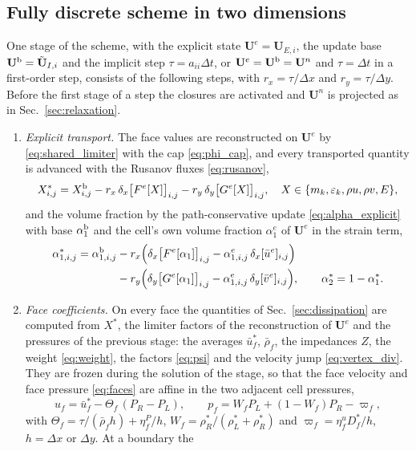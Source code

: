 \subsection{Fully discrete scheme in two dimensions}
\label{sec:fully}
One stage of the scheme, with the explicit state $\mathbf U^e=\mathbf U_{E,i}$, the update base $\mathbf U^{\rm b}=\tilde{\mathbf U}_{I,i}$ and the implicit step
$\tau=a_{ii}\Delta t$, or $\mathbf U^e=\mathbf U^{\rm b}=\mathbf U^n$ and $\tau=\Delta t$ in a first-order step, consists of the following steps, with $r_x=\tau/\Delta x$
and $r_y=\tau/\Delta y$. Before the first stage of a step the closures are activated and $\mathbf U^n$ is projected as in
Sec.~\ref{sec:relaxation}.
\begin{enumerate}
\item \emph{Explicit transport.} The face values are reconstructed on $\mathbf U^e$ by \eqref{eq:shared_limiter} with the cap \eqref{eq:phi_cap}, and every
transported quantity is advanced with the Rusanov fluxes \eqref{eq:rusanov},
\[
X^*_{i,j}=X^{\rm b}_{i,j}-r_x\,\delta_x\big[F^e[X]\big]_{i,j}-r_y\,\delta_y\big[G^e[X]\big]_{i,j},\quad
X\in\{m_k,\varepsilon_k,\rho u,\rho v,E\},
\]
and the volume fraction by the path-conservative update
\eqref{eq:alpha_explicit} with base $\alpha^{\rm b}_1$ and the cell's own volume fraction $\alpha^e_1$ of $\mathbf U^e$ in the strain term,
\[
\begin{aligned}
\alpha^*_{1,i,j}=\alpha^{\rm b}_{1,i,j}&-r_x\Big(\delta_x\big[F^e[\alpha_1]\big]_{i,j}-\alpha^e_{1,i,j}\,\delta_x[\bar u^e]_{i,j}\Big)\\
&-r_y\Big(\delta_y\big[G^e[\alpha_1]\big]_{i,j}-\alpha^e_{1,i,j}\,\delta_y[\bar v^e]_{i,j}\Big),\qquad \alpha^*_2=1-\alpha^*_1 .
\end{aligned}
\]
\item \emph{Face coefficients.} On every face the quantities of Sec.~\ref{sec:dissipation} are computed from $X^*$, the
limiter factors of the reconstruction of $\mathbf U^e$ and the pressures of the previous stage: the averages $\bar u^*_f$, $\bar\rho_f$, the impedances $Z$, the weight \eqref{eq:weight},
the factors \eqref{eq:psi} and the velocity jump \eqref{eq:vertex_div}. They are frozen during the solution of the stage,
so that the face velocity and face pressure \eqref{eq:faces} are affine in the two adjacent cell pressures,
\[
u_f=\bar u^*_f-\Theta_f\,(P_R-P_L),\qquad p_f=W_fP_L+(1-W_f)P_R-\varpi_f ,
\]
with $\Theta_f=\tau/(\bar\rho_f h)+\eta^P_f/h$, $W_f=\rho^*_R/(\rho^*_L+\rho^*_R)$ and $\varpi_f=\eta^u_fD^*_f/h$, $h=\Delta x$ or $\Delta y$. At a boundary the

\end{enumerate}
